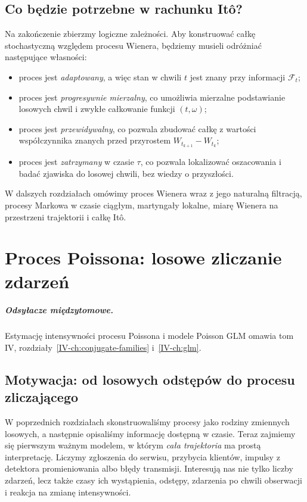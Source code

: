 \documentclass[11pt,a4paper,oneside]{report}
\numberwithin{equation}{chapter}
\theoremstyle{plain}
\theoremstyle{definition}
\theoremstyle{remark}
\newcommand{\calF}{\mathcal{F}}
\begin{document}
\section{Co będzie potrzebne w rachunku Itô?}
Na zakończenie zbierzmy logiczne zależności.
Aby konstruować całkę stochastyczną względem procesu Wienera,
będziemy musieli odróżniać następujące własności:
\begin{itemize}
\item proces jest \emph{adaptowany}, a więc stan w chwili $t$
jest znany przy informacji $\calF_t$;
\item proces jest \emph{progresywnie mierzalny}, co umożliwia
mierzalne podstawianie losowych chwil i zwykłe całkowanie
funkcji $(t,\omega)$;
\item proces jest \emph{przewidywalny}, co pozwala zbudować
całkę z wartości współczynnika znanych przed
przyrostem $W_{t_{k+1}}-W_{t_k}$;
\item proces jest \emph{zatrzymany} w czasie $\tau$,
co pozwala lokalizować oszacowania i badać zjawiska
do losowej chwili, bez wiedzy o przyszłości.
\end{itemize}
W dalszych rozdziałach omówimy proces Wienera
wraz z jego naturalną filtracją, procesy Markowa
w czasie ciągłym, martyngały lokalne, miarę Wienera
na przestrzeni trajektorii i całkę Itô.


\chapter{Proces Poissona: losowe zliczanie zdarzeń}
\label{ch:poisson-process}
\paragraph{Odsyłacze międzytomowe.} Estymację intensywności procesu Poissona i modele Poisson GLM omawia tom IV, rozdziały~\ref{IV-ch:conjugate-families} i~\ref{IV-ch:glm}.


\section{Motywacja: od losowych odstępów do procesu zliczającego}
W poprzednich rozdziałach skonstruowaliśmy procesy jako rodziny
zmiennych losowych, a następnie opisaliśmy informację dostępną w czasie.
Teraz zajmiemy się pierwszym ważnym modelem, w którym \emph{cała
trajektoria} ma prostą interpretację. Liczymy zgłoszenia do serwisu,
przybycia klientów, impulsy z detektora promieniowania albo błędy
transmisji. Interesują nas nie tylko liczby zdarzeń, lecz także czasy
ich wystąpienia, odstępy, zdarzenia po chwili obserwacji i reakcja na
zmianę intensywności.
\end{document}

